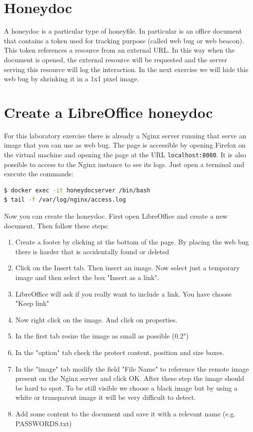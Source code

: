 \documentclass[epsfig,a4paper,11pt,titlepage,oneside,openany]{book}
\begin{document}
\section{Honeydoc}
A honeydoc is a  particular type of honeyfile. In particular is an office document that contains a token used for tracking purpose (called web bug or web beacon). This token  references a resource from an external URL. In this way when the document is opened, the external resource will be requested and the server serving this resource will log the interaction. In the next exercise we will hide this web bug by shrinking it in a 1x1  pixel image.

\section{Create a LibreOffice honeydoc}

For this laboratory exercise there is already a Nginx server running that serve an image that you can use as web bug. The page is accessible by opening Firefox on the virtual machine and opening the page at the URL \texttt{localhost:8080}.
It is also possible to access to the Nginx instance to see its logs. Just open a terminal and execute the commands:
\begin{lstlisting}[language=bash]
$ docker exec -it honeydocserver /bin/bash
$ tail -f /var/log/nginx/access.log 
\end{lstlisting}

Now you can create the honeydoc. First open LibreOffice and create a new document. Then follow these steps:
\begin{enumerate}
\itemsep0em
\item Create a footer by clicking at the bottom of the page. By placing the web bug there is harder that is accidentally found or  deleted
\item Click on the Insert tab. Then insert an image. Now select just a temporary image  and then select the box "Insert as a link".
\item LibreOffice will ask if you really want to include a link. You have choose "Keep link"
\item Now right click on the image. And click on properties.
\item In the first tab resize the image as small as possible (0.2")
\item In the "option" tab check the protect content, position and size boxes.
\item In the "image" tab modify the field "File Name" to reference the remote image present on the Nginx server and click OK. After these step the image should be hard to spot. To be still visible we choose a black image but by using a white or transparent image it will be very difficult to detect.
\item Add some content to the document and save it with a relevant name (e.g. PASSWORDS.txt) 
\end{enumerate}
\end{document}

